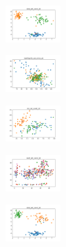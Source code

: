 \begin{figure}[H]
    \begin{subfigure}
        \centering
        \includegraphics[width=0.234\textwidth]{img/agesf/rand_set_const_20_277451237_clust.png}
    \end{subfigure}
    \hfill
    \begin{subfigure}
        \centering
        \includegraphics[width=0.234\textwidth]{img/agesf/newthyroid_set_const_20_277451237_clust.png}
    \end{subfigure}
    \hfill
    \begin{subfigure}
        \centering
        \includegraphics[width=0.234\textwidth]{img/agesf/iris_set_const_20_49258669_clust.png}
    \end{subfigure}
    \hfill
    \begin{subfigure}
        \centering
        \includegraphics[width=0.234\textwidth]{img/agesf/ecoli_set_const_20_49258669_clust.png}
    \end{subfigure}
    \hfill
    \begin{subfigure}
        \centering
        \includegraphics[width=0.234\textwidth]{img/agesf/rand_set_const_20_49258669_clust.png}
    \end{subfigure}
    \hfill
    \begin{subfigure}
        \centering

\end{subfigure}
\end{figure}
